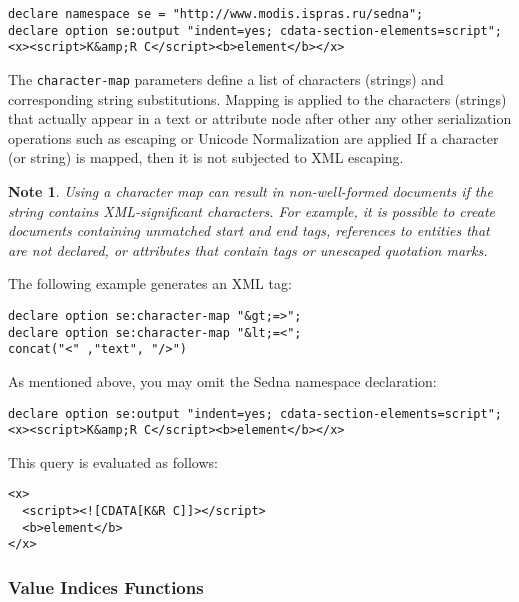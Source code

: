 \documentclass[a4paper,12pt]{article}
\newtheorem{note}{Note}    %
\begin{document}
\begin{verbatim}
declare namespace se = "http://www.modis.ispras.ru/sedna";
declare option se:output "indent=yes; cdata-section-elements=script";
<x><script>K&amp;R C</script><b>element</b></x>
\end{verbatim}

The \verb!character-map! parameters define a list of characters (strings) and
corresponding string substitutions. Mapping is applied to the characters
(strings) that actually appear in a text or attribute node after other any
other serialization operations such as escaping or Unicode Normalization are
applied  If a character (or string) is mapped, then it is not subjected to XML
escaping.

\begin{note}
Using a character map can result in non-well-formed documents if the string
contains XML-significant characters. For example, it is possible to create
documents containing unmatched start and end tags, references to entities that
are not declared, or attributes that contain tags or unescaped quotation marks.
\end{note}

The following example generates an XML tag:

\begin{verbatim}
declare option se:character-map "&gt;=>";
declare option se:character-map "&lt;=<";
concat("<" ,"text", "/>")
\end{verbatim}

As mentioned above, you may omit the Sedna namespace declaration:
\begin{verbatim}
declare option se:output "indent=yes; cdata-section-elements=script";
<x><script>K&amp;R C</script><b>element</b></x>
\end{verbatim}

This query is evaluated as follows:
\begin{verbatim}
<x>
  <script><![CDATA[K&R C]]></script>
  <b>element</b>
</x>
\end{verbatim}


\subsubsection{Value Indices Functions}
\label{sec:value-index-scan-fun}
\end{document}
